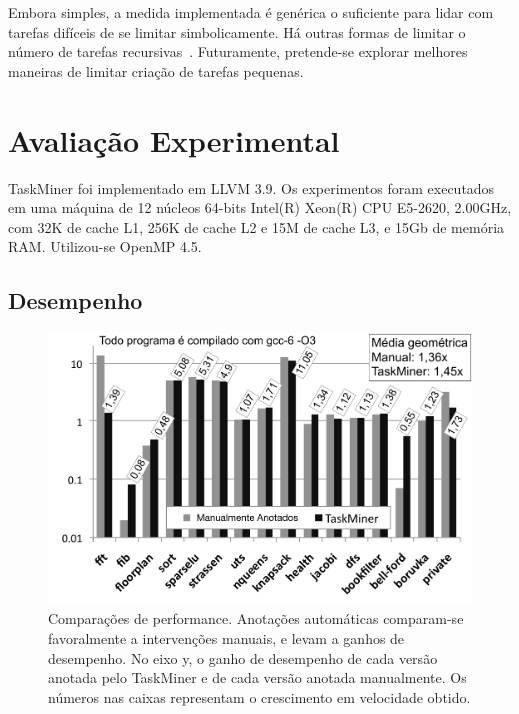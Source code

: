 \documentclass[sigconf]{acmart}
\newcommand\Taskminer{\mbox{\textsf{TaskMiner}}}
\begin{document}
Embora simples, a medida implementada é genérica o suficiente para lidar com 
tarefas difíceis de se
limitar simbolicamente. 
Há outras formas de limitar o número de tarefas recursivas~\cite{Iwasaki16}.
Futuramente, 
pretende-se explorar melhores maneiras de
limitar criação de tarefas pequenas.

\section{Avalia\c{c}\~{a}o Experimental}
\label{sec:eval}

{\Taskminer} foi implementado em LLVM 3.9. Os experimentos
foram executados em uma máquina de 12 núcleos 64-bits Intel(R) Xeon(R) CPU E5-2620, 2.00GHz, com 32K de cache L1, 256K de cache L2 e 15M de cache L3, e 15Gb de memória RAM. Utilizou-se OpenMP 4.5.

\subsection{Desempenho}
\label{sub:performance}

\begin{figure}[b!]
\begin{center}
\includegraphics[width=1\columnwidth]{images/TM_Performance}
\caption{Comparações de performance. Anotações automáticas comparam-se favoralmente a intervenções
manuais, e levam a ganhos de desempenho. No eixo y, o ganho de desempenho de cada versão anotada
pelo {\Taskminer} e de cada versão anotada manualmente. Os números nas caixas representam
o crescimento em velocidade obtido.}
\label{fig:TM_Performance}
\end{center}
\end{figure}
\end{document}
